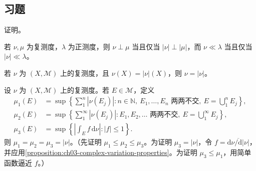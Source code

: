 \documentclass[../../main.tex]{subfiles}%
\begin{document}
\subsection*{习题}
\begin{exercise}\label{exercise:ch03-complex-integral-variation}
证明。
\end{exercise}
\begin{exercise}\label{exercise:ch03-complex-singular-absolute}
若 $\nu,\mu$ 为复测度，$\lambda$ 为正测度，则 $\nu\perp\mu$ 当且仅当 $|\nu|\perp|\mu|$，而 $\nu\ll\lambda$ 当且仅当 $|\nu|\ll\lambda$。
\end{exercise}
\begin{exercise}\label{exercise:ch03-complex-positive-criterion}
若 $\nu$ 为 $(X,\mathscr{M})$ 上的复测度，且 $\nu(X)=|\nu|(X)$，则 $\nu=|\nu|$。
\end{exercise}
\begin{exercise}\label{exercise:ch03-complex-variation-suprema}
设 $\nu$ 为 $(X,\mathscr{M})$ 上的复测度。若 $E\in\mathscr{M}$，定义
\begin{align*}
\mu_1(E)&=\sup\left\{\sum_1^n|\nu(E_j)|:n\in\mathbb{N},\ E_1,\ldots,E_n\text{ 两两不交},\ E=\bigcup_1^nE_j\right\},\\
\mu_2(E)&=\sup\left\{\sum_1^\infty|\nu(E_j)|:E_1,E_2,\ldots\text{ 两两不交},\ E=\bigcup_1^\infty E_j\right\},\\
\mu_3(E)&=\sup\left\{\left|\int_E f\,\mathrm{d}\nu\right|:|f|\le1\right\}.
\end{align*}
则 $\mu_1=\mu_2=\mu_3=|\nu|$。（先证明 $\mu_1\le\mu_2\le\mu_3$。为证明 $\mu_3=|\nu|$，令 $f=\overline{\mathrm{d}\nu/\mathrm{d}|\nu|}$，并应用\cref{proposition:ch03-complex-variation-properties}。为证明 $\mu_3\le\mu_1$，用简单函数逼近 $f$。）
\end{exercise}
\end{document}
